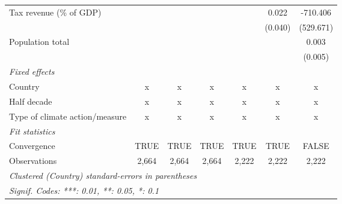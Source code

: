 \begin{tabular}{lcccccc}
   Tax revenue (\% of GDP)                                  &                &                &                &                & 0.022          & -710.406\\   
                                                            &                &                &                &                & (0.040)        & (529.671)\\   
   Population total                                         &                &                &                &                &                & 0.003\\   
                                                            &                &                &                &                &                & (0.005)\\   
   \emph{Fixed effects}\\
   Country                                                  & x              & x              & x              & x              & x              & x\\  
   Half decade                                              & x              & x              & x              & x              & x              & x\\  
   Type of climate action/measure                           & x              & x              & x              & x              & x              & x\\  
   \midrule \emph{Fit statistics}\\
   Convergence                                              &TRUE            & TRUE           & TRUE           & TRUE           & TRUE           & FALSE\\  
   Observations                                             & 2,664          & 2,664          & 2,664          & 2,222          & 2,222          & 2,222\\  
   \midrule
   \multicolumn{7}{l}{\emph{Clustered (Country) standard-errors in parentheses}}\\
   \multicolumn{7}{l}{\emph{Signif. Codes: ***: 0.01, **: 0.05, *: 0.1}}\\
\end{tabular}
\par\endgroup


